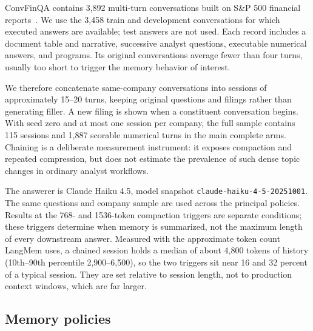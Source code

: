 \documentclass[conference,a4paper]{IEEEtran}
\begin{document}
ConvFinQA contains 3,892 multi-turn conversations built on S\&P 500 financial reports~\cite{chen2022convfinqa}. We use the 3,458 train and development conversations for which executed answers are available; test answers are not used. Each record includes a document table and narrative, successive analyst questions, executable numerical answers, and programs. Its original conversations average fewer than four turns, usually too short to trigger the memory behavior of interest.

We therefore concatenate same-company conversations into sessions of approximately 15--20 turns, keeping original questions and filings rather than generating filler. A new filing is shown when a constituent conversation begins. With seed zero and at most one session per company, the full sample contains 115 sessions and 1,887 scorable numerical turns in the main complete arms. Chaining is a deliberate measurement instrument: it exposes compaction and repeated compression, but does not estimate the prevalence of such dense topic changes in ordinary analyst workflows.

The answerer is Claude Haiku 4.5, model snapshot \texttt{claude-haiku-4-5-20251001}. The same questions and company sample are used across the principal policies. Results at the 768- and 1536-token compaction triggers are separate conditions; these triggers determine when memory is summarized, not the maximum length of every downstream answer. Measured with the approximate token count LangMem uses, a chained session holds a median of about 4,800 tokens of history (10th--90th percentile 2,900--6,500), so the two triggers sit near 16 and 32 percent of a typical session. They are set relative to session length, not to production context windows, which are far larger.

\subsection{Memory policies}
\end{document}
